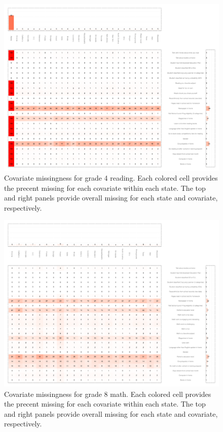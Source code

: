 \begin{figure}[h]
\begin{center}
\includegraphics[width=\textwidth]{../Figures2009/g4read-missing.pdf}
\caption[Covariate missingness for grade 4 reading]{Covariate missingness for grade 4 reading. Each colored cell provides the precent missing for each covariate within each state. The top and right panels provide overall missing for each state and covariate, respectively.}
\label{fig:g4reading:missing}
\end{center}
\end{figure}

\begin{figure}[h]
\begin{center}
\includegraphics[width=\textwidth]{../Figures2009/g8math-missing.pdf}
\caption[Covariate missingness for grade 8 math]{Covariate missingness for grade 8 math. Each colored cell provides the precent missing for each covariate within each state. The top and right panels provide overall missing for each state and covariate, respectively.}
\label{fig:g8math:missing}
\end{center}
\end{figure}


